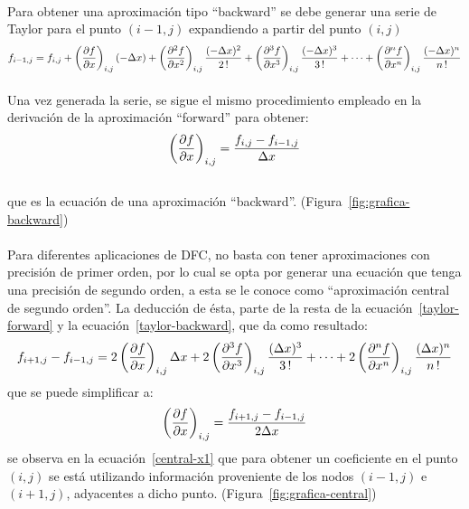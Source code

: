 \documentclass[letterpaper, openright, 12pt]{book}
\begin{document}
\paragraph*{}
    Para obtener una aproximación tipo ``backward'' se debe generar una serie de Taylor para el punto $(i-1, j)$ expandiendo a partir del punto $(i, j)$
    \begin{equation}
    f_{i-1, j} = f_{i,j} + \left(\pdv{f}{x}\right)_{i,j} (-\Delta x)
    + \left(\pdv[2]{f}{x} \right)_{i,j} \frac{(-\Delta x)^2 }{2\,!}
    + \left( \pdv[3]{f}{x} \right)_{i,j} \frac{(-\Delta x)^3}{3\,!}
    + \dotsb + \left(\pdv[n]{f}{x} \right)_{i,j} \frac{(-\Delta x)^n}{n\,!}
    \label{taylor-backward}
    \end{equation}
\paragraph{}
    Una vez generada la serie, se sigue el mismo procedimiento empleado en la
    derivación de la aproximación ``forward'' para obtener:
    \begin{equation}
    \left( \pdv{f}{x} \right)_{i,j} = \frac{f_{i,j} - f_{i-1,j}}{\Delta x}
    \label{backward-x1}
    \end{equation}
    \\que es la ecuación de una aproximación ``backward''. (Figura~\ref{fig:grafica-backward})

    \paragraph*{}
    Para diferentes aplicaciones de DFC, no basta con tener aproximaciones con
    precisión de primer orden, por lo cual se opta por generar una ecuación que
    tenga una precisión de segundo orden, a esta se le conoce como
    ``aproximación central de segundo orden''. La deducción de ésta, parte de la
    resta de la ecuación~\ref{taylor-forward} y la ecuación~\ref{taylor-backward},
    que da como resultado:
    \begin{equation}
    f_{i+1,j} - f_{i-1, j} = 2 \left( \pdv{f}{x} \right)_{i,j} \Delta x + 2 \left( \pdv[3]{f}{x} \right)_{i,j} \frac{(\Delta x)^3}{3 \,!} + \dotsb + 2 \left( \pdv[n]{f}{x} \right)_{i,j} \frac{(\Delta x)^n}{n\,!}
    \end{equation}
    que se puede simplificar a:\\
    \begin{equation}
    \left( \pdv{f}{x} \right)_{i,j} = \frac{f_{i+1,j} - f_{i-1,j}}{2 \Delta x}
    \label{central-x1}
    \end{equation}
    se observa en la ecuación~\ref{central-x1} que para obtener un coeficiente
    en el punto $(i,j)$ se está utilizando información proveniente de los nodos
    $(i-1, j)$ e $(i+1, j)$, adyacentes a dicho punto. (Figura~\ref{fig:grafica-central})
\end{document}
